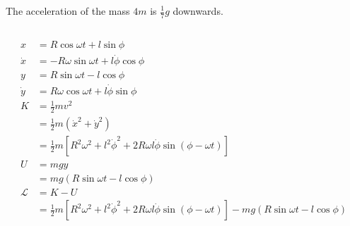 \documentclass{article}
\begin{document}
The acceleration of the mass $4 m$ is $\frac{1}{7} g$ downwards.

\setcounter{subsection}{28}
\subsection{}

\begin{align*}
  x           & = R \cos \omega t + l \sin \phi                                                                                                          \\
  \dot{x}     & = -R \omega \sin \omega t + l \dot{\phi} \cos \phi                                                                                       \\
  y           & = R \sin \omega t - l \cos \phi                                                                                                          \\
  \dot{y}     & = R \omega \cos \omega t + l \dot{\phi} \sin \phi                                                                                        \\
  K           & = \frac{1}{2} m v^2                                                                                                                      \\
              & = \frac{1}{2} m (\dot{x}^2 + \dot{y}^2)                                                                                                  \\
              & = \frac{1}{2} m [R^2 \omega^2 + l^2 \dot{\phi}^2 + 2 R \omega l \dot{\phi} \sin (\phi - \omega t)]                                       \\
  U           & = m g y                                                                                                                                  \\
              & = m g (R \sin \omega t - l \cos \phi)                                                                                                    \\
  \mathcal{L} & = K - U                                                                                                                                  \\
              & = \frac{1}{2} m [R^2 \omega^2 + l^2 \dot{\phi}^2 + 2 R \omega l \dot{\phi} \sin (\phi - \omega t)] - m g (R \sin \omega t - l \cos \phi) \\
\end{align*}
\end{document}
